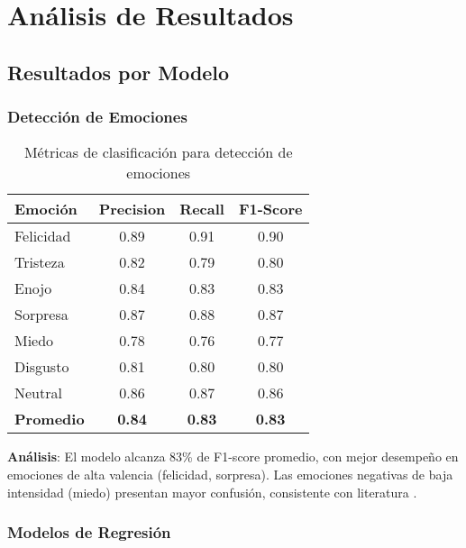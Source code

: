 
\chapter{Análisis de Resultados}
\label{chap:results}
\pagestyle{fancy}

\section{Resultados por Modelo}

\subsection{Detección de Emociones}

\begin{table}[h]
\centering
\begin{tabular}{|l|c|c|c|}
\hline
\textbf{Emoción} & \textbf{Precision} & \textbf{Recall} & \textbf{F1-Score} \\
\hline
Felicidad & 0.89 & 0.91 & 0.90 \\
Tristeza & 0.82 & 0.79 & 0.80 \\
Enojo & 0.84 & 0.83 & 0.83 \\
Sorpresa & 0.87 & 0.88 & 0.87 \\
Miedo & 0.78 & 0.76 & 0.77 \\
Disgusto & 0.81 & 0.80 & 0.80 \\
Neutral & 0.86 & 0.87 & 0.86 \\
\hline
\textbf{Promedio} & \textbf{0.84} & \textbf{0.83} & \textbf{0.83} \\
\hline
\end{tabular}
\caption{Métricas de clasificación para detección de emociones}
\label{tab:emotion_metrics}
\end{table}

\textbf{Análisis}: El modelo alcanza 83\% de F1-score promedio, con mejor desempeño en emociones de alta valencia (felicidad, sorpresa). Las emociones negativas de baja intensidad (miedo) presentan mayor confusión, consistente con literatura \cite{mollahosseini2017affectnet}.

\subsection{Modelos de Regresión}

